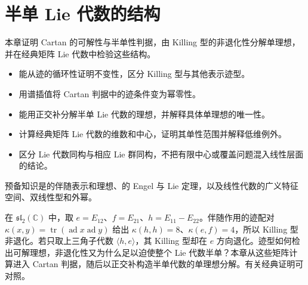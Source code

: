 
\chapter{半单 Lie 代数的结构}
\label{b5:ch:13}

\begin{chapterabstract}
	本章证明 Cartan 的可解性与半单性判据，由 Killing 型的非退化性分解单理想，并在经典矩阵 Lie 代数中检验这些结构。
\end{chapterabstract}

\begin{learninggoals}
	\begin{itemize}
		\item 能从迹的循环性证明不变性，区分 Killing 型与其他表示迹型。
		\item 用谱插值将 Cartan 判据中的迹条件变为幂零性。
		\item 能用正交补分解半单 Lie 代数的理想，并解释具体单理想的唯一性。
		\item 计算经典矩阵 Lie 代数的维数和中心，证明其单性范围并解释低维例外。
		\item 区分 Lie 代数同构与相应 Lie 群同构，不把有限中心或覆盖问题混入线性层面的结论。
	\end{itemize}
	预备知识是的伴随表示和理想、的 Engel 与 Lie 定理，以及线性代数的广义特征空间、双线性型和外幂。
\end{learninggoals}

在 \(\mathfrak{sl}_2(\mathbb C)\) 中，取 \(e=E_{12}\)、\(f=E_{21}\)、\(h=E_{11}-E_{22}\)。伴随作用的迹配对 \(\kappa(x,y)=\operatorname{tr}(\operatorname{ad}x\operatorname{ad}y)\) 给出 \(\kappa(h,h)=8\)、\(\kappa(e,f)=4\)，所以 Killing 型非退化。若只取上三角子代数 \(\langle h,e\rangle\)，其 Killing 型却在 \(e\) 方向退化。迹型如何检出可解理想，非退化性又为什么足以迫使整个 Lie 代数半单？本章从这些矩阵计算进入 Cartan 判据，随后以正交补构造半单代数的单理想分解。有关经典证明可对照\cite[Sections 4.3, 5.1--5.2, pp.~19--23]{Humphreys1972LieAlgebras}。







